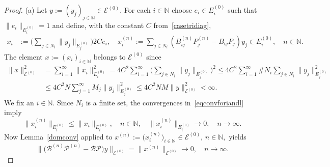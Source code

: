 \documentclass[a4paper,reqno]{amsart}
\begin{document}
\begin{proof}
(a) Let $y:=(y_j)_{j\in{\mathbb{N}}}\in {\mathcal E}^{(0)}$.
For each $i\in{\mathbb{N}}$ choose $e_i\in E_i^{(0)}$ such that $\|e_i\|_{E_i^{(0)}}=1$ and define, with the constant $C$ from~\ref{casetridiag},
\begin{align*}
x_i&:=\bigg(\sum_{j\in N_i} \|y_j\|_{E_j^{(0)}}\bigg)2Ce_i,\quad
 x_i^{(n)}:=\sum_{j\in N_i}\left(B_{ij}^{(n)}P_j^{(n)}- B_{ij}P_j\right)y_j\in E_i^{(0)},\quad n\in{\mathbb{N}}.
\end{align*}
The element $x:=(x_i)_{i\in{\mathbb{N}}}$ belongs to ${\mathcal E}^{(0)}$ since 
\begin{align*}
\|x\|_{{\mathcal E}^{(0)}}^2&=
\sum_{i=1}^{\infty}\|x_i\|_{E_i^{(0)}}^2
= 4C^2\sum_{i=1}^{\infty}\bigg(\sum_{j\in N_i} \|y_j\|_{E_j^{(0)}}\bigg)^2 
\leq 4C^2\sum_{i=1}^{\infty}\#N_i \sum_{j\in N_i} \|y_j\|_{E_j^{(0)}}^2\\
&\leq  4C^2 N  \sum_{j=1}^{\infty}M_j\|y_j\|_{E_j^{(0)}}^2
\leq 4C^2N M\|y\|_{{\mathcal E}^{(0)}}^2<\infty.
\end{align*}
We fix an $i\in{\mathbb{N}}$. Since $N_i$ is a finite set, the convergences in~\eqref{eqconvforiandl} imply 
$$\big\|x_i^{(n)}\big\|_{E_i^{(0)}}\leq \big\|x_i\big\|_{E_i^{(0)}}, \quad n\in{\mathbb{N}},\quad \big\|x_i^{(n)}\big\|_{E_i^{(0)}}{\longrightarrow} 0, \quad n\to\infty.$$
Now Lemma~\ref{domconv} applied to $x^{(n)}:=\big(x_i^{(n)}\big)_{i\in{\mathbb{N}}}\in{\mathcal E}^{(0)}, \,n\in{\mathbb{N}},$ yields
\begin{equation*}\big\|\big({\mathcal B}^{(n)}{\mathcal P}^{(n)}-{\mathcal B}{\mathcal P}\big)y\big\|_{{\mathcal E}^{(0)}}=\big\|x^{(n)}\big\|_{{\mathcal E}^{(0)}}{\longrightarrow} 0, \quad n\to\infty.\end{equation*}


\end{proof}
\end{document}
